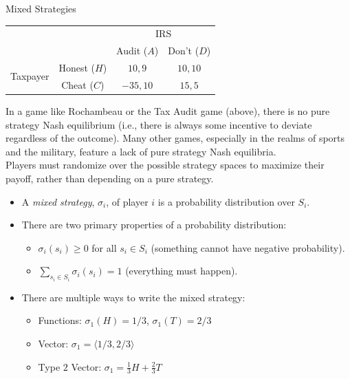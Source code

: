 \documentclass[8pt]{extarticle}
\begin{document}
  \begin{problem}{Mixed Strategies}
    \begin{center}
      \renewcommand{\arraystretch}{1.5}
      \begin{tabular}{cc|c|c|}
        \multicolumn{1}{c}{}&\multicolumn{1}{c}{}&\multicolumn{2}{c}{IRS}\\
                            &\multicolumn{1}{c}{}&\multicolumn{1}{c}{Audit ($A$)} & \multicolumn{1}{c}{Don't ($D$)}\\
        \cline{3-4}
        \multirow{2}{4em}{Taxpayer} & Honest ($H$) & $10,9$ & $10,10$ \\
        \cline{3-4}
                                    & Cheat ($C$) & $-35,10$ & $15,5$\\
        \cline{3-4}
      \end{tabular}
    \end{center}
    In a game like Rochambeau or the Tax Audit game (above), there is no pure strategy Nash equilibrium (i.e., there is always some incentive to deviate regardless of the outcome). Many other games, especially in the realms of sports and the military, feature a lack of pure strategy Nash equilibria.\\

    Players must randomize over the possible strategy spaces to maximize their payoff, rather than depending on a pure strategy.
    \begin{itemize}
      \item A \textit{mixed strategy}, $\sigma_i$, of player $i$ is a probability distribution over $S_i$.
      \item There are two primary properties of a probability distribution:
        \begin{itemize}
          \item $\sigma_i(s_i) \geq 0$ for all $s_i \in S_i$ (something cannot have negative probability).
          \item $\sum_{s_i\in S_i}\sigma_i(s_i) = 1$ (everything must happen).
        \end{itemize}
      \item There are multiple ways to write the mixed strategy:
        \begin{itemize}
          \item Functions: $\sigma_1(H) = 1/3$, $\sigma_1(T) = 2/3$
          \item Vector: $\sigma_1 = \langle 1/3,2/3\rangle$
          \item Type $2$ Vector: $\sigma_1 = \frac{1}{3}H + \frac{2}{3}T$
        \end{itemize}
    \end{itemize}
  \end{problem}
\end{document}
